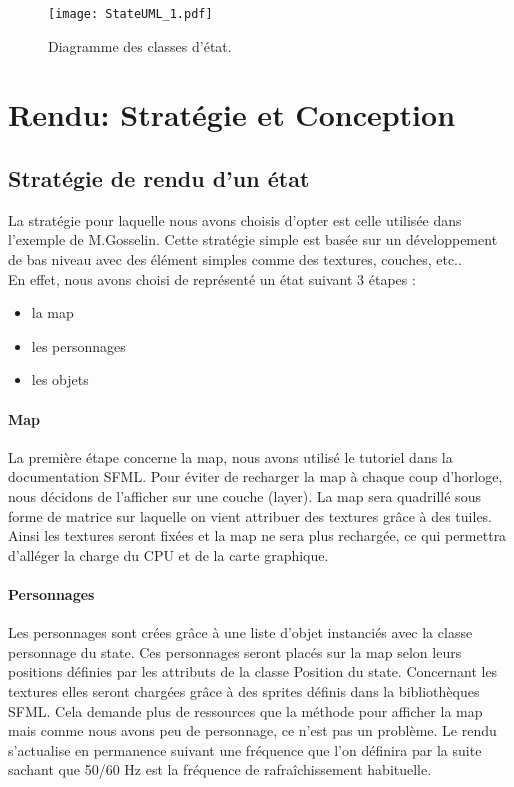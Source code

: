 \documentclass[a4paper,12pt]{article}
\begin{document}
\begin{landscape}
\begin{figure}[p]
\texttt{[image: StateUML\_1.pdf]}
\caption{\label{uml:state}Diagramme des classes d'état.} 
\end{figure}
\end{landscape}

\clearpage
\section{Rendu: Stratégie et Conception}

\subsection{Stratégie de rendu d'un état}
La stratégie pour laquelle nous avons choisis d'opter est celle utilisée dans l'exemple de M.Gosselin. Cette stratégie simple est basée sur un développement de bas niveau avec des élément simples comme des textures, couches, etc..\\
En effet, nous avons choisi de représenté un état suivant 3 étapes :\\
\begin{itemize}
\item la map 
\item les personnages
\item les objets\\
\end{itemize}
\par 
\paragraph{Map}
La première étape concerne la map, nous avons utilisé le tutoriel dans la documentation SFML. Pour éviter de recharger la map à chaque coup d'horloge, nous décidons de l'afficher sur une couche (layer). La map sera quadrillé sous forme de matrice sur laquelle on vient attribuer des textures grâce à des tuiles. Ainsi les textures seront fixées et la map ne sera plus rechargée, ce qui permettra d'alléger la charge du CPU et de la carte graphique.\\
\paragraph{Personnages}
Les personnages sont crées grâce à une liste d'objet instanciés avec la classe personnage du state. Ces personnages seront placés sur la map selon leurs positions définies par les attributs de la classe Position du state. Concernant les textures elles seront chargées grâce à des sprites définis dans la bibliothèques SFML. Cela demande plus de ressources que la méthode pour afficher la map mais comme nous avons peu de personnage, ce n'est pas un problème. Le rendu s'actualise en permanence suivant une fréquence que l'on définira par la suite sachant que 50/60 Hz est la fréquence de rafraîchissement habituelle.
\end{document}
